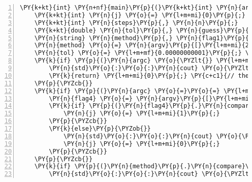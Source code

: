 \begin{Verbatim}[tabsize=2,commandchars=\\\{\},numbers=left,firstnumber=1,stepnumber=1]
\PY{k+kt}{int} \PY{n+nf}{main}\PY{p}{(}\PY{k+kt}{int} \PY{n}{argc}\PY{p}{,} \PY{k+kt}{char}\PY{o}{*} \PY{n}{argv}\PY{p}{[}\PY{p}{]}\PY{p}{)}\PY{p}{\PYZob{}}
	\PY{k+kt}{int} \PY{n}{j} \PY{o}{=} \PY{l+m+mi}{0}\PY{p}{;} 
	\PY{k+kt}{int} \PY{n}{steps}\PY{p}{,} \PY{n}{n}\PY{p}{;}
	\PY{k+kt}{double} \PY{n}{tol}\PY{p}{,} \PY{n}{guess}\PY{p}{;}
	\PY{n}{string} \PY{n}{method}\PY{p}{,} \PY{n}{flag1}\PY{p}{,} \PY{n}{flag4}\PY{p}{;}
	\PY{n}{method} \PY{o}{=} \PY{n}{argv}\PY{p}{[}\PY{l+m+mi}{2}\PY{p}{]}\PY{p}{;} \PY{c+c1}{// allow us to check this is given correctly later}
	\PY{n}{tol} \PY{o}{=} \PY{l+m+mf}{0.00000000001}\PY{p}{;} \PY{c+c1}{// set the tolerance}
	\PY{k}{if} \PY{p}{(}\PY{n}{argc} \PY{o}{\PYZlt{}} \PY{l+m+mi}{4}\PY{p}{)}\PY{p}{\PYZob{}}
		\PY{n}{std}\PY{o}{:}\PY{o}{:}\PY{n}{cout} \PY{o}{\PYZlt{}}\PY{o}{\PYZlt{}} \PY{l+s}{\PYZdq{}}\PY{l+s}{Usage: ode [\PYZhy{}b1/\PYZhy{}b2/\PYZhy{}i] [method] [steps] \PYZhy{}f}\PY{l+s}{\PYZdq{}} \PY{o}{\PYZlt{}}\PY{o}{\PYZlt{}} \PY{n}{std}\PY{o}{:}\PY{o}{:}\PY{n}{endl}\PY{p}{;}
		\PY{k}{return} \PY{l+m+mi}{0}\PY{p}{;} \PY{c+c1}{// the minimum number of arguements is 3}
	\PY{p}{\PYZcb{}}
	\PY{k}{if} \PY{p}{(}\PY{n}{argc} \PY{o}{=}\PY{o}{=} \PY{l+m+mi}{5}\PY{p}{)}\PY{p}{\PYZob{}}
		\PY{n}{flag4} \PY{o}{=} \PY{n}{argv}\PY{p}{[}\PY{l+m+mi}{4}\PY{p}{]}\PY{p}{;}
		\PY{k}{if} \PY{p}{(}\PY{n}{flag4}\PY{p}{.}\PY{n}{compare}\PY{p}{(}\PY{l+s}{\PYZdq{}}\PY{l+s}{\PYZhy{}f}\PY{l+s}{\PYZdq{}}\PY{p}{)} \PY{o}{=}\PY{o}{=} \PY{l+m+mi}{0}\PY{p}{)}\PY{p}{\PYZob{}}
			\PY{n}{j} \PY{o}{=} \PY{l+m+mi}{1}\PY{p}{;}
		\PY{p}{\PYZcb{}}
		\PY{k}{else}\PY{p}{\PYZob{}}
			\PY{n}{std}\PY{o}{:}\PY{o}{:}\PY{n}{cout} \PY{o}{\PYZlt{}}\PY{o}{\PYZlt{}} \PY{l+s}{\PYZdq{}}\PY{l+s}{Assuming not writing into file}\PY{l+s}{\PYZdq{}} \PY{o}{\PYZlt{}}\PY{o}{\PYZlt{}} \PY{n}{std}\PY{o}{:}\PY{o}{:}\PY{n}{endl}\PY{p}{;}
			\PY{n}{j} \PY{o}{=} \PY{l+m+mi}{0}\PY{p}{;}
		\PY{p}{\PYZcb{}}
	\PY{p}{\PYZcb{}}
	\PY{k}{if} \PY{p}{(}\PY{n}{method}\PY{p}{.}\PY{n}{compare}\PY{p}{(}\PY{l+s}{\PYZdq{}}\PY{l+s}{euler}\PY{l+s}{\PYZdq{}}\PY{p}{)} \PY{o}{!}\PY{o}{=} \PY{l+m+mi}{0} \PY{o}{\PYZam{}}\PY{o}{\PYZam{}} \PY{n}{method}\PY{p}{.}\PY{n}{compare}\PY{p}{(}\PY{l+s}{\PYZdq{}}\PY{l+s}{midpoint}\PY{l+s}{\PYZdq{}}\PY{p}{)} \PY{o}{!}\PY{o}{=} \PY{l+m+mi}{0} \PY{o}{\PYZam{}}\PY{o}{\PYZam{}} \PY{n}{method}\PY{p}{.}\PY{n}{compare}\PY{p}{(}\PY{l+s}{\PYZdq{}}\PY{l+s}{runge\PYZhy{}kutta}\PY{l+s}{\PYZdq{}}\PY{p}{)} \PY{o}{!}\PY{o}{=} \PY{l+m+mi}{0}\PY{p}{)} \PY{p}{\PYZob{}}
		\PY{n}{std}\PY{o}{:}\PY{o}{:}\PY{n}{cout} \PY{o}{\PYZlt{}}\PY{o}{\PYZlt{}} \PY{l+s}{\PYZdq{}}\PY{l+s}{Please choose either the euler, midpoint or runge\PYZhy{}kutta method}\PY{l+s}{\PYZdq{}} \PY{o}{\PYZlt{}}\PY{o}{\PYZlt{}} \PY{n}{endl}\PY{p}{;}

\end{Verbatim}
